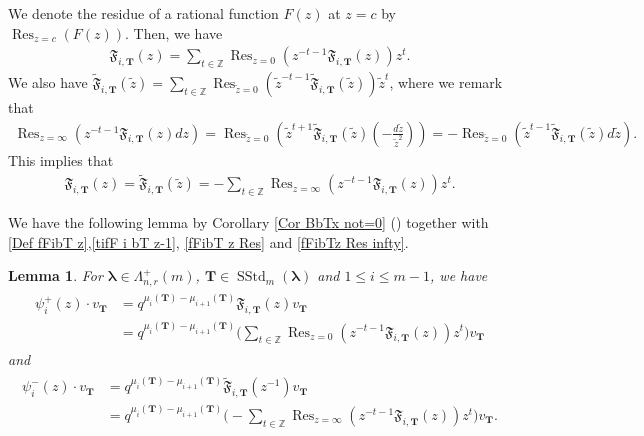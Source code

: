 \documentclass[12pt]{amsart}
\newtheorem{lem}[thm]{Lemma}
\numberwithin{equation}{thm}
\newcommand\ZZ{\mathbb Z}
\newcommand\bT{\mathbf T}
\newcommand\fF{\mathfrak F}
\newcommand\vL{\varLambda}
\newcommand\Bla{\boldsymbol\lambda}
\newcommand\ti{\tilde}
\newcommand\Res{\operatorname{Res}}
\newcommand{\SStd}{\operatorname{SStd}}
\newcounter{ni}
\newcommand{\roii}{\roman{ni}}
\begin{document}
We denote the residue of a rational function $F(z)$ at $z=c$ by $\Res_{z=c} (F(z))$. 
Then, we have 
\begin{align}
\label{fFibT z Res}
\fF_{i,\bT}(z) = \sum_{t \in \ZZ} \Res_{z=0} (z^{- t-1} \fF_{i,\bT}(z)) z^t.  
\end{align}
We also have 
$\ti{\fF}_{i, \bT} (\ti{z}) =\sum_{t \in \ZZ} \Res_{\ti{z}=0} (\ti{z}^{- t-1} \ti{\fF}_{i,\bT}(\ti{z})) \ti{z}^t$, 
where we remark that 
\begin{align*}
\Res_{z=\infty} (z^{-t-1} \fF_{i,\bT}(z)  dz )
= \Res_{\ti{z}=0} (\ti{z}^{t+1} \ti{\fF}_{i,\bT}(\ti{z}) ( - \frac{d \ti{z}}{\ti{z}^2}) )
= - \Res_{\ti{z}=0} (\ti{z}^{t-1} \ti{\fF}_{i,\bT} (\ti{z})  d \ti{z}). 
\end{align*}
This implies that 
\begin{align}
\label{fFibTz Res infty}
\fF_{i,\bT}(z) = \ti{\fF}_{i,\bT} (\ti{z})= - \sum_{t \in \ZZ} \Res_{z=\infty} (z^{-t-1} \fF_{i,\bT}(z) )  z^t. 
\end{align}

We have the following lemma by Corollary \ref{Cor BbTx not=0} (\roii) together with 
\eqref{Def fFibT z},\eqref{tifF i bT z-1}, \eqref{fFibT z Res} and \eqref{fFibTz Res infty}. 


\begin{lem} 
\label{Lemma psiiz vbT}
For $\Bla \in \vL_{n,r}^+(m)$, $\bT \in \SStd_m(\Bla)$ and $1 \leq i \leq m-1$, we have 
\begin{align}
\label{psi i z+ vbT Res}
\begin{split}
\psi_i^+(z) \cdot v_{\bT} 
	&= q^{\mu_i(\bT) - \mu_{i+1}(\bT)} \fF_{i,\bT}(z) v_{\bT} 
	\\
	&= q^{\mu_i(\bT) - \mu_{i+1} (\bT)} 
		\big( \sum_{t \in \ZZ} \Res_{z=0} (z^{- t-1} \fF_{i,\bT}(z)) z^t \big) v_{\bT}
\end{split}
\end{align}
and 
\begin{align}
\label{psi i - z vbT Res}
\begin{split}
\psi_i^-(z) \cdot v_{\bT} 
	&= q^{\mu_i(\bT) - \mu_{i+1} (\bT)} \ti{\fF}_{i,\bT} (z^{-1}) v_{\bT} 
	\\
	&= q^{\mu_i(\bT) - \mu_{i+1} (\bT)} 
		\big( - \sum_{t \in \ZZ} \Res_{z=\infty} (z^{-t-1} \fF_{i,\bT}(z) ) z^t \big) v_{\bT}. 
\end{split}
\end{align}
\end{lem} 
\end{document}
